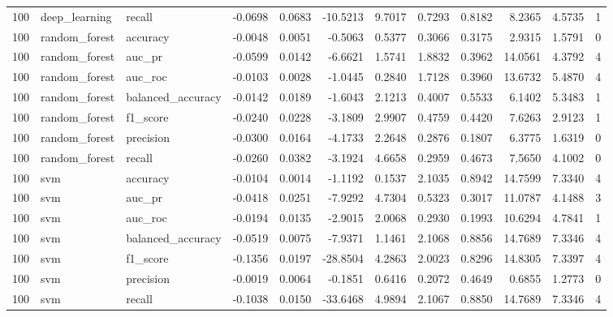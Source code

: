 \begin{tabular}{rllrrrrrrrrl}
100 & deep_learning & recall & -0.0698 & 0.0683 & -10.5213 & 9.7017 & 0.7293 & 0.8182 & 8.2365 & 4.5735 & 1 \\
100 & random_forest & accuracy & -0.0048 & 0.0051 & -0.5063 & 0.5377 & 0.3066 & 0.3175 & 2.9315 & 1.5791 & 0 \\
100 & random_forest & auc_pr & -0.0599 & 0.0142 & -6.6621 & 1.5741 & 1.8832 & 0.3962 & 14.0561 & 4.3792 & 4 \\
100 & random_forest & auc_roc & -0.0103 & 0.0028 & -1.0445 & 0.2840 & 1.7128 & 0.3960 & 13.6732 & 5.4870 & 4 \\
100 & random_forest & balanced_accuracy & -0.0142 & 0.0189 & -1.6043 & 2.1213 & 0.4007 & 0.5533 & 6.1402 & 5.3483 & 1 \\
100 & random_forest & f1_score & -0.0240 & 0.0228 & -3.1809 & 2.9907 & 0.4759 & 0.4420 & 7.6263 & 2.9123 & 1 \\
100 & random_forest & precision & -0.0300 & 0.0164 & -4.1733 & 2.2648 & 0.2876 & 0.1807 & 6.3775 & 1.6319 & 0 \\
100 & random_forest & recall & -0.0260 & 0.0382 & -3.1924 & 4.6658 & 0.2959 & 0.4673 & 7.5650 & 4.1002 & 0 \\
100 & svm & accuracy & -0.0104 & 0.0014 & -1.1192 & 0.1537 & 2.1035 & 0.8942 & 14.7599 & 7.3340 & 4 \\
100 & svm & auc_pr & -0.0418 & 0.0251 & -7.9292 & 4.7304 & 0.5323 & 0.3017 & 11.0787 & 4.1488 & 3 \\
100 & svm & auc_roc & -0.0194 & 0.0135 & -2.9015 & 2.0068 & 0.2930 & 0.1993 & 10.6294 & 4.7841 & 1 \\
100 & svm & balanced_accuracy & -0.0519 & 0.0075 & -7.9371 & 1.1461 & 2.1068 & 0.8856 & 14.7689 & 7.3346 & 4 \\
100 & svm & f1_score & -0.1356 & 0.0197 & -28.8504 & 4.2863 & 2.0023 & 0.8296 & 14.8305 & 7.3397 & 4 \\
100 & svm & precision & -0.0019 & 0.0064 & -0.1851 & 0.6416 & 0.2072 & 0.4649 & 0.6855 & 1.2773 & 0 \\
100 & svm & recall & -0.1038 & 0.0150 & -33.6468 & 4.9894 & 2.1067 & 0.8850 & 14.7689 & 7.3346 & 4 \\
\bottomrule
\end{tabular}
